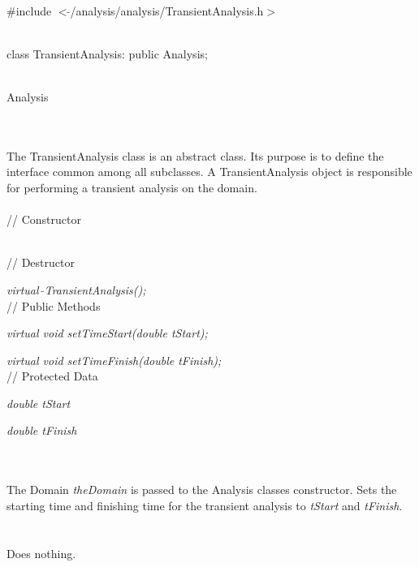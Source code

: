 
   \\
\#include $<\tilde{ }$/analysis/analysis/TransientAnalysis.h$>$  


  \\
class TransientAnalysis: public Analysis;  


 \\
Analysis 

\indent{} \\

 \\ 
\indent The TransientAnalysis class is an abstract class. Its purpose is
to define the interface common among all subclasses. A TransientAnalysis
object is responsible for performing a transient analysis on the domain. \\


 \\
// Constructor 

\\  
// Destructor 

{\em virtual~$\tilde{}$TransientAnalysis();}\\ 

// Public Methods

{\em virtual void setTimeStart(double tStart);}

{\em virtual void setTimeFinish(double tFinish);}\\ 

// Protected Data 

{\em double tStart} 

{\em double tFinish} 


 \\
\\  
The Domain {\em theDomain} is passed to the Analysis classes
constructor. Sets the starting time and finishing time for the
transient analysis to {\em tStart} and {\em tFinish}. \\

 \\
\\ 
Does nothing. \\

